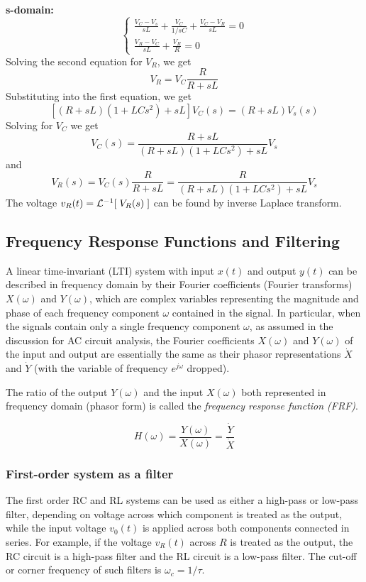 
{\bf s-domain:}
\[
\left\{
\begin{array}{l}
\frac{V_C-V_s}{sL}+\frac{V_C}{1/sC}+\frac{V_C-V_R}{sL}=0\\
\frac{V_R-V_C}{sL}+\frac{V_R}{R}=0
\end{array}\right.
\]
Solving the second equation for $V_R$, we get
\[
V_R=V_C\frac{R}{R+sL}
\]
Substituting into the first equation, we get
\[
[(R+sL)(1+LC s^2)+sL]V_C(s)=(R+sL)V_s(s)
\]
Solving for $V_C$ we get
\[
V_C(s)=\frac{R+sL}{(R+sL)(1+LCs^2)+sL}V_s
\]
and
\[
V_R(s)=V_C(s)\frac{R}{R+sL}=\frac{R}{(R+sL)(1+LCs^2)+sL}V_s
\]
The voltage $v_R(t)={\cal L}^{-1}[\;V_R(s)\;]$ can be found
by inverse Laplace transform.

\subsection*{Frequency Response Functions and Filtering}

A linear time-invariant (LTI) system with input $x(t)$ and output $y(t)$ 
can be described in frequency domain by their Fourier coefficients 
(Fourier transforms) $X(\omega)$ and $Y(\omega)$,  which are complex 
variables representing the magnitude and phase of each frequency component 
$\omega$ contained in the signal. In particular, when the signals contain 
only a single frequency component $\omega$, as assumed in the discussion 
for AC circuit analysis, the Fourier coefficients $X(\omega)$ and $Y(\omega)$ 
of the input and output are essentially the same as their phasor representations
$\dot{X}$ and $\dot{Y}$ (with the variable of frequency $e^{j\omega}$ dropped).

The ratio of the output $Y(\omega)$ and the input $X(\omega)$ both represented
in frequency domain (phasor form) is called the {\em frequency response function 
(FRF)}. 

\[
H(\omega)=\frac{Y(\omega)}{X(\omega)}=\frac{\dot{Y}}{\dot{X}}
\]

\subsubsection*{First-order system as a filter}

The first order RC and RL systems can be used as either a high-pass or
low-pass filter, depending on voltage across which component is treated
as the output, while the input voltage $v_0(t)$ is applied across both 
components connected in series. For example, if the voltage $v_R(t)$ 
across $R$ is treated as the output, the RC circuit is a high-pass filter 
and the RL circuit is a low-pass filter. The cut-off or corner frequency 
of such filters is $\omega_c=1/\tau$.

